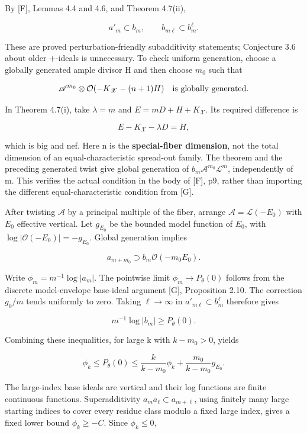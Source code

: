 \documentclass[11pt]{article}
\begin{document}
By [F], Lemmas 4.4 and 4.6, and Theorem 4.7(ii),

\[
a'_m\subset b_m,\qquad b_{m\ell}\subset b_m^\ell.
\]

These are proved perturbation-friendly subadditivity statements; Conjecture 3.6 about older +-ideals is unnecessary. To check uniform generation, choose a globally generated ample divisor H and then choose \(m_0\) such that

\[
\mathscr A^{m_0}\otimes\mathcal O(-K_{\mathscr X}-(n+1)H)
\quad\hbox{is globally generated}.
\]

In Theorem 4.7(i), take \(\lambda=m\) and \(E=mD+H+K_{\mathscr X}\). Its required difference is

\[
E-K_{\mathscr X}-\lambda D=H,
\]

which is big and nef. Here n is the \textbf{special-fiber dimension}, not the total dimension of an equal-characteristic spread-out family. The theorem and the preceding generated twist give global generation of \(b_m\mathscr A^{m_0}\mathscr L^m\), independently of m. This verifies the actual condition in the body of [F], p9, rather than importing the different equal-characteristic condition from [G].

After twisting \(\mathscr A\) by a principal multiple of the fiber, arrange \(\mathscr A=\mathscr L(-E_0)\) with \(E_0\) effective vertical. Let \(g_{E_0}\) be the bounded model function of \(E_0\), with \(\log|\mathcal O(-E_0)|=-g_{E_0}\). Global generation implies

\[
a_{m+m_0}\supset b_m\mathcal O(-m_0E_0).
\]

Write \(\phi_m=m^{-1}\log|a_m|\). The pointwise limit \(\phi_m\to P_\theta(0)\) follows from the discrete model-envelope base-ideal argument [G], Proposition 2.10. The correction \(g_0/m\) tends uniformly to zero. Taking \(\ell\to\infty\) in \(a'_{m\ell}\subset b_m^\ell\) therefore gives

\[
m^{-1}\log|b_m|\geq P_\theta(0).
\]

Combining these inequalities, for large k with \(k-m_0>0\), yields

\[
\phi_k\leq P_\theta(0)
\leq\frac{k}{k-m_0}\phi_k+
\frac{m_0}{k-m_0}g_{E_0}.
\]

The large-index base ideals are vertical and their log functions are finite continuous functions. Superadditivity \(a_ma_\ell\subset a_{m+\ell}\), using finitely many large starting indices to cover every residue class modulo a fixed large index, gives a fixed lower bound \(\phi_k\geq-C\). Since \(\phi_k\leq0\),
\end{document}
